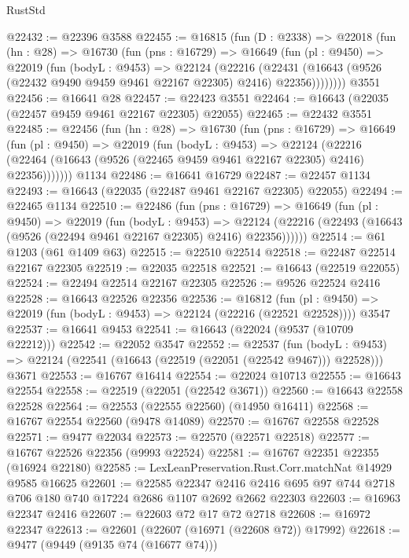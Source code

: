 \begin{lexlean}{RustStd}
\begin{coremodule}
@22432 := @22396 @3588
@22455 := @16815
    (fun (D : @2338) =>
    @22018
      (fun (hn : @28) =>
      @16730
        (fun (pns : @16729) =>
        @16649
          (fun (pl : @9450) =>
          @22019
            (fun (bodyL : @9453) =>
            @22124
              (@22216
                (@22431
                  (@16643 (@9526 (@22432 @9490 @9459 @9461 @22167 @22305) @2416) @22356))))))))
    @3551
@22456 := @16641 @28
@22457 := @22423 @3551
@22464 := @16643 (@22035 (@22457 @9459 @9461 @22167 @22305) @22055)
@22465 := @22432 @3551
@22485 := @22456
    (fun (hn : @28) =>
    @16730
      (fun (pns : @16729) =>
      @16649
        (fun (pl : @9450) =>
        @22019
          (fun (bodyL : @9453) =>
          @22124
            (@22216 (@22464 (@16643 (@9526 (@22465 @9459 @9461 @22167 @22305) @2416) @22356)))))))
    @1134
@22486 := @16641 @16729
@22487 := @22457 @1134
@22493 := @16643 (@22035 (@22487 @9461 @22167 @22305) @22055)
@22494 := @22465 @1134
@22510 := @22486
    (fun (pns : @16729) =>
    @16649
      (fun (pl : @9450) =>
      @22019
        (fun (bodyL : @9453) =>
        @22124 (@22216 (@22493 (@16643 (@9526 (@22494 @9461 @22167 @22305) @2416) @22356))))))
@22514 := @61 @1203 (@61 @1409 @63)
@22515 := @22510 @22514
@22518 := @22487 @22514 @22167 @22305
@22519 := @22035 @22518
@22521 := @16643 (@22519 @22055)
@22524 := @22494 @22514 @22167 @22305
@22526 := @9526 @22524 @2416
@22528 := @16643 @22526 @22356
@22536 := @16812
    (fun (pl : @9450) => @22019 (fun (bodyL : @9453) => @22124 (@22216 (@22521 @22528))))
    @3547
@22537 := @16641 @9453
@22541 := @16643 (@22024 (@9537 (@10709 @22212)))
@22542 := @22052 @3547
@22552 := @22537
    (fun (bodyL : @9453) => @22124 (@22541 (@16643 (@22519 (@22051 (@22542 @9467))) @22528)))
    @3671
@22553 := @16767 @16414
@22554 := @22024 @10713
@22555 := @16643 @22554
@22558 := @22519 (@22051 (@22542 @3671))
@22560 := @16643 @22558 @22528
@22564 := @22553 (@22555 @22560) (@14950 @16411)
@22568 := @16767 @22554 @22560 (@9478 @14089)
@22570 := @16767 @22558 @22528
@22571 := @9477 @22034
@22573 := @22570 (@22571 @22518)
@22577 := @16767 @22526 @22356 (@9993 @22524)
@22581 := @16767 @22351 @22355 (@16924 @22180)
@22585 := LexLeanPreservation.Rust.Corr.matchNat @14929 @9585 @16625
@22601 := @22585
    @22347
    @2416
    @2416
    @695
    @97
    @744
    @2718
    @706
    @180
    @740
    @17224
    @2686
    @1107
    @2692
    @2662
    @22303
@22603 := @16963 @22347 @2416
@22607 := @22603 @72 @17 @72 @2718
@22608 := @16972 @22347
@22613 := @22601 (@22607 (@16971 (@22608 @72)) @17992)
@22618 := @9477 (@9449 (@9135 @74 (@16677 @74)))

\end{coremodule}
\end{lexlean}
